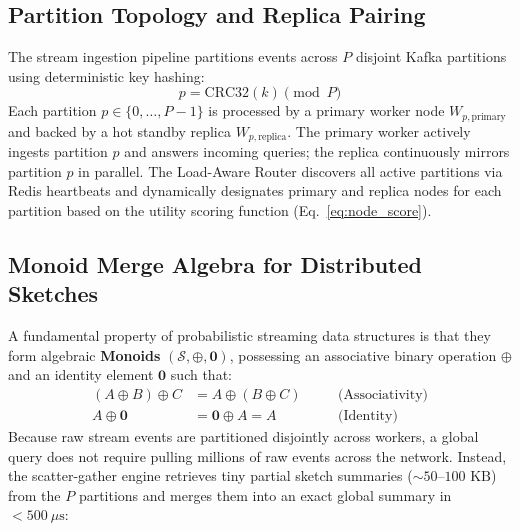 \subsection{Partition Topology and Replica Pairing}
The stream ingestion pipeline partitions events across $P$ disjoint Kafka partitions using deterministic key hashing:
\begin{equation}
    p = \text{CRC32}(k) \pmod P
\end{equation}
Each partition $p \in \{0, \dots, P-1\}$ is processed by a primary worker node $W_{p, \text{primary}}$ and backed by a hot standby replica $W_{p, \text{replica}}$. The primary worker actively ingests partition $p$ and answers incoming queries; the replica continuously mirrors partition $p$ in parallel. The Load-Aware Router discovers all active partitions via Redis heartbeats and dynamically designates primary and replica nodes for each partition based on the utility scoring function (Eq.~\ref{eq:node_score}).

\subsection{Monoid Merge Algebra for Distributed Sketches}
A fundamental property of probabilistic streaming data structures is that they form algebraic \textbf{Monoids} $(\mathcal{S}, \oplus, \mathbf{0})$, possessing an associative binary operation $\oplus$ and an identity element $\mathbf{0}$ such that:
\begin{align}
    (A \oplus B) \oplus C &= A \oplus (B \oplus C) \quad &&\text{(Associativity)} \\
    A \oplus \mathbf{0} &= \mathbf{0} \oplus A = A \quad &&\text{(Identity)}
\end{align}
Because raw stream events are partitioned disjointly across workers, a global query does not require pulling millions of raw events across the network. Instead, the scatter-gather engine retrieves tiny partial sketch summaries ($\sim 50\text{--}100\text{ KB}$) from the $P$ partitions and merges them into an exact global summary in $<500\ \mu\text{s}$:

